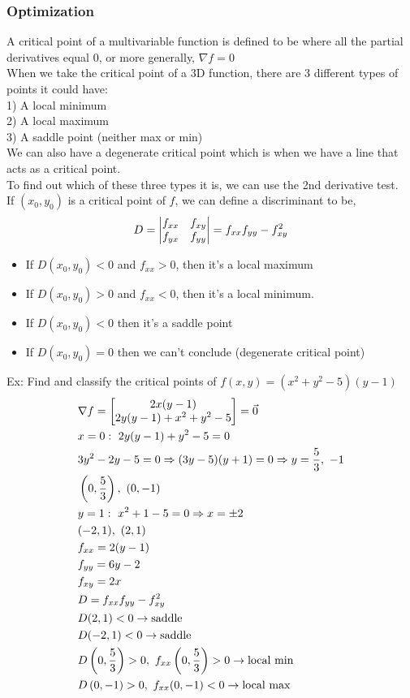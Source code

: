 \documentclass[11pt, fleqn]{article}
\begin{document}
\subsubsection{Optimization}
A critical point of a multivariable function is defined to be where all the partial derivatives equal 0, or more generally, $\nabla f=0$\\
When we take the critical point of a 3D function, there are 3 different types of points it could have:\\
1) A local minimum\\
2) A local maximum\\
3) A saddle point (neither max or min)\\
We can also have a degenerate critical point which is when we have a line that acts as a critical point.\\
To find out which of these three types it is, we can use the 2nd derivative test.\\
If $(x_0,y_0)$ is a critical point of $f$, we can define a discriminant to be,
$$D=\left|\begin{matrix} f_{xx}&f_{xy}\\f_{yx}&f_{yy} \end{matrix}\right|=f_{xx}f_{yy}-f_{xy}^2$$
\begin{itemize}
    \item If $D(x_0,y_0)<0$ and $f_{xx}>0$, then it's a local maximum
    \item If $D(x_0,y_0)>0$ and $f_{xx}<0$, then it's a local minimum.
    \item If $D(x_0,y_0)<0$ then it's a saddle point
    \item If $D(x_0,y_0)=0$ then we can't conclude (degenerate critical point)
\end{itemize}
Ex: Find and classify the critical points of $f(x,y)=(x^2+y^2-5)(y-1)$\\
\begin{align*}
    &\nabla f=\matrixx{2x(y-1)\\2y(y-1)+x^2+y^2-5}=\vec{0}\\
    &x=0:\ 2y(y-1)+y^2-5=0\\
    &3y^2-2y-5=0\Ra (3y-5)(y+1)=0\Ra y=\frac{5}{3},\ -1\\
    &\brround{0,\frac{5}{3}},\ (0,-1)\\
    &y=1:\ x^2+1-5=0\Ra x=\pm2\\
    &(-2,1),\ (2,1)\\
    &f_{xx}=2(y-1)\\
    &f_{yy}=6y-2\\
    &f_{xy}=2x\\
    &D=f_{xx}f_{yy}-f_{xy}^2\\
    &D(2,1)<0\to\text{saddle}\\
    &D(-2,1)<0\to\text{saddle}\\
    &D\brround{0,\frac{5}{3}}>0,\ f_{xx}\brround{0,\frac{5}{3}}>0\to\text{local min}\\
    &D\brround{0,-1}>0,\ f_{xx}(0,-1)<0\to\text{local max}
\end{align*}
\end{document}
